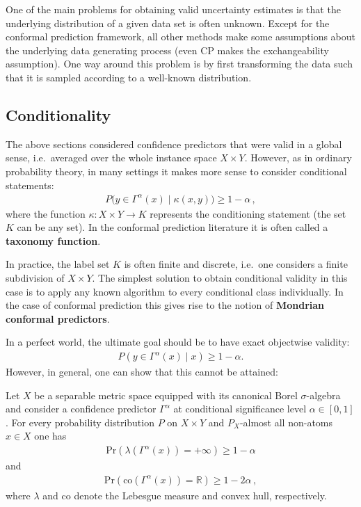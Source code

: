     One of the main problems for obtaining valid uncertainty estimates is that the underlying distribution of a given data set is often unknown. Except for the conformal prediction framework, all other methods make some assumptions about the underlying data generating process (even CP makes the exchangeability assumption). One way around this problem is by first transforming the data such that it is sampled according to a well-known distribution.



\subsection{Conditionality}

    The above sections considered confidence predictors that were valid in a global sense, i.e.~averaged over the whole instance space $X\times Y$. However, as in ordinary probability theory, in many settings it makes more sense to consider conditional statements:
    \begin{gather}
        \label{data:conditional_validity_condition}
        P\big(y\in\Gamma^\alpha(x)\mid\kappa(x,y)\big)\geq 1-\alpha\,,
    \end{gather}
    where the function $\kappa:X\times Y\rightarrow K$ represents the conditioning statement (the set $K$ can be any set). In the conformal prediction literature it is often called a \textbf{taxonomy function}.

    In practice, the label set $K$ is often finite and discrete, i.e.~one considers a finite subdivision of $X\times Y$. The simplest solution to obtain conditional validity in this case is to apply any known algorithm to every conditional class individually. In the case of conformal prediction this gives rise to the notion of \textbf{Mondrian conformal predictors}.

    In a perfect world, the ultimate goal should be to have exact objectwise validity:
    \begin{gather}
        P(y\in\Gamma^\alpha(x)\mid x)\geq 1-\alpha.
    \end{gather}
    However, in general, one can show that this cannot be attained:
    \begin{property}[No-go theorem]
        Let $X$ be a separable metric space equipped with its canonical Borel $\sigma$-algebra and consider a confidence predictor $\Gamma^\alpha$ at conditional significance level $\alpha\in[0,1]$. For every probability distribution $P$ on $X\times Y$ and $P_X$-almost all non-atoms $x\in X$ one has
        \begin{gather}
            \mathrm{Pr}(\lambda(\Gamma^\alpha(x))=+\infty)\geq 1-\alpha
        \end{gather}
        and
        \begin{gather}
            \mathrm{Pr}(\mathrm{co}(\Gamma^\alpha(x))=\mathbb{R})\geq 1-2\alpha\,,
        \end{gather}
        where $\lambda$ and $\mathrm{co}$ denote the Lebesgue measure and convex hull, respectively.
    \end{property}


